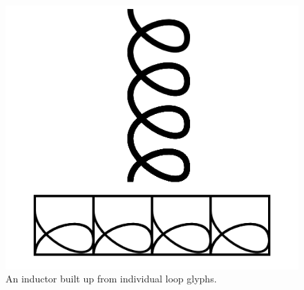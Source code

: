 \documentclass[11pt]{article}
\begin{document}
\begin{figure}
    
\includegraphics[width=\linewidth]{figures/figure19_inductor.png}

\caption{An inductor built up from individual loop glyphs.}
\end{figure}
\end{document}
